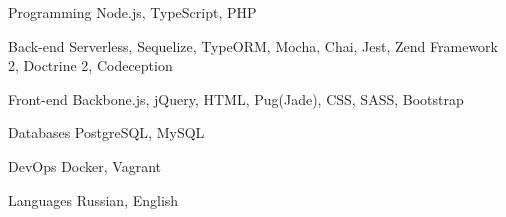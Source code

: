 

\begin{cvskills}

  \cvskill
    {Programming} %
    {Node.js, TypeScript, PHP} %

  \cvskill
    {Back-end} %
    {Serverless, Sequelize, TypeORM, Mocha, Chai, Jest, Zend Framework 2, Doctrine 2, Codeception} %

  \cvskill
    {Front-end} %
    {Backbone.js, jQuery, HTML, Pug(Jade), CSS, SASS, Bootstrap} %

  \cvskill
    {Databases} %
    {PostgreSQL, MySQL} %

  \cvskill
    {DevOps} %
    {Docker, Vagrant} %

  \cvskill
    {Languages} %
    {Russian, English} %

\end{cvskills}

